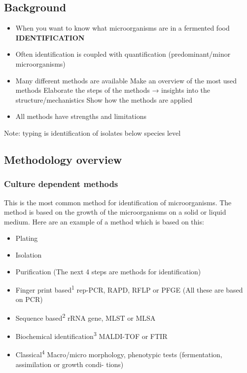 \subsection{Background}

\begin{highlight}
    \begin{itemize}
        \item When you want to know what microorganisms are in a fermented food
        \subitem \textbf{IDENTIFICATION}
        \item Often identification is coupled with quantification (predominant/minor microorganisms)
        \item Many different methods are available
        \subitem Make an overview of the most used methods
        \subitem Elaborate the steps of the methods → insights into the structure/mechanistics
        \subitem Show how the methods are applied
        \item All methods have strengths and limitations
    \end{itemize}
\end{highlight}

Note: typing is identification of isolates below species level

\subsection{Methodology overview}

\subsubsection*{Culture dependent methods}
This is the most common method for identification of microorganisms. The method is based on the growth of the microorganisms on a solid or liquid medium. Here are an example of a method which is based on this:
\begin{highlight}
    \begin{itemize}
        \item Plating
        \item Isolation
        \item Purification (The next 4 steps are methods for identification)
        \item Finger print based\textsuperscript{1}
        \subitem rep-PCR, RAPD, RFLP or PFGE (All these are based on PCR)
        \item Sequence based\textsuperscript{2}
        \subitem rRNA gene, MLST or MLSA
        \item Biochemical identification\textsuperscript{3}
        \subitem MALDI-TOF or FTIR
        \item Classical\textsuperscript{4}
        \subitem Macro/micro morphology, phenotypic tests (fermentation, assimilation or growth condi-
        \subitem tions)
    \end{itemize}
\end{highlight}



